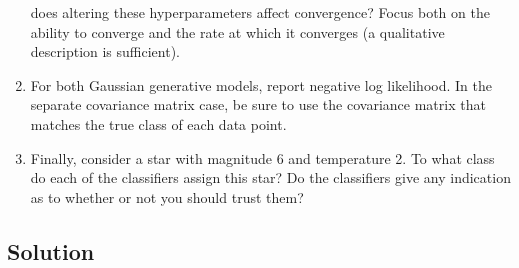 \documentclass[submit]{harvardml}
\begin{document}
\begin{problem}
\begin{enumerate}
  does altering these hyperparameters affect convergence? Focus both
  on the ability to converge and the rate at which it converges (a
  qualitative description is sufficient).
\item For both Gaussian generative models, report negative log
  likelihood. In the separate covariance matrix case, be sure to use
  the covariance matrix that matches the true class of each data
  point.
\item Finally, consider a star with magnitude 6 and temperature 2.
  To what class do each of the classifiers assign this star?  Do the
  classifiers give any indication as to whether or not you should
  trust them?
\end{enumerate}
\end{problem}
\subsection*{Solution}
\end{document}
